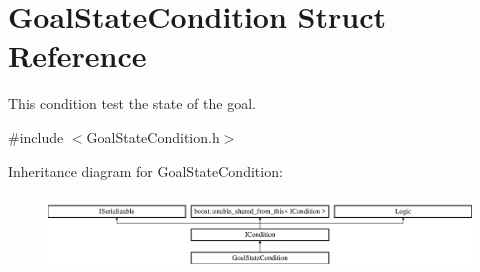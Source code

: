 \hypertarget{struct_goal_state_condition}{}\section{Goal\+State\+Condition Struct Reference}
\label{struct_goal_state_condition}


This condition test the state of the goal.  




{\ttfamily \#include $<$Goal\+State\+Condition.\+h$>$}

Inheritance diagram for Goal\+State\+Condition\+:\begin{figure}[H]
\begin{center}
\leavevmode
\includegraphics[height=2.014389cm]{struct_goal_state_condition}
\end{center}
\end{figure}
